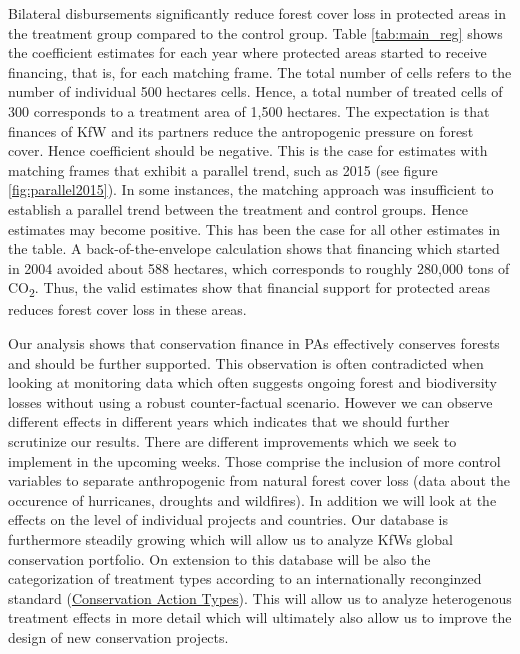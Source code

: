\documentclass{article}
\begin{document}
Bilateral disbursements significantly reduce forest cover loss in protected areas in the treatment group compared to the control group. Table \ref{tab:main_reg} shows the coefficient estimates for each year where protected areas started to receive financing, that is, for each matching frame. The total number of cells refers to the number of individual 500 hectares cells. Hence, a total number of treated cells of 300 corresponds to a treatment area of 1,500 hectares. The expectation is that finances of KfW and its partners reduce the antropogenic pressure on forest cover. Hence coefficient should be negative. This is the case for estimates with matching frames that exhibit a parallel trend, such as 2015 (see figure \ref{fig:parallel2015}). In some instances, the matching approach was insufficient to establish a parallel trend between the treatment and control groups. Hence estimates may become positive. This has been the case for all other estimates in the table. A back-of-the-envelope calculation shows that financing which started in 2004 avoided about 588 hectares, which corresponds to roughly 280,000 tons of CO\textsubscript{2}. Thus, the valid estimates show that financial support for protected areas reduces forest cover loss in these areas.

Our analysis shows that conservation finance in PAs effectively conserves forests and should be further supported. This observation is often contradicted when looking at monitoring data which often suggests ongoing forest and biodiversity losses without using a robust counter-factual scenario. However we can observe different effects in different years which indicates that we should further scrutinize our results. There are different improvements which we seek to implement in the upcoming weeks. Those comprise the inclusion of more control variables to separate anthropogenic from natural forest cover loss (data about the occurence of hurricanes, droughts and wildfires). In addition we will look at the effects on the level of individual projects and countries. Our database is furthermore steadily growing which will allow us to analyze KfWs global conservation portfolio. On extension to this database will be also the categorization of treatment types according to an internationally reconginzed standard (\href{https://www.iucnredlist.org/resources/conservation-actions-classification-scheme}{Conservation Action Types}). This will allow us to analyze heterogenous treatment effects in more detail which will ultimately also allow us to improve the design of new conservation projects. 
\end{document}
